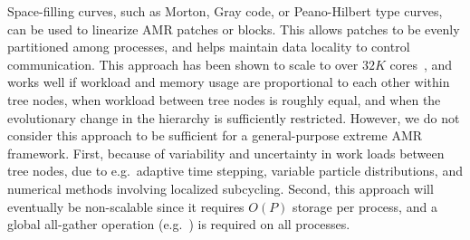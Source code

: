 \documentclass[11pt,letterpaper]{article}
\begin{document}
Space-filling curves, such as Morton, Gray code, or Peano-Hilbert type
curves, can be used to linearize AMR patches or blocks.  This allows
patches to be evenly partitioned among processes, and helps maintain
data locality to control communication.  This approach has been shown
to scale to over $32K$ cores~\cite{BuGh08}, and works well if workload
and memory usage are proportional to each other within tree nodes,
when workload between tree nodes is roughly equal, and when the
evolutionary change in the hierarchy is sufficiently restricted.
However, we do not consider this approach to be sufficient for a
general-purpose extreme AMR framework.  First, because of variability
and uncertainty in work loads between tree nodes, due to e.g.~adaptive
time stepping, variable particle distributions, and numerical methods
involving localized subcycling.
%
%
%
%
Second, this approach will eventually be non-scalable since it
requires $O(P)$ storage per process, and a global all-gather
operation (e.g.~) is required on all processes.

\end{document}
